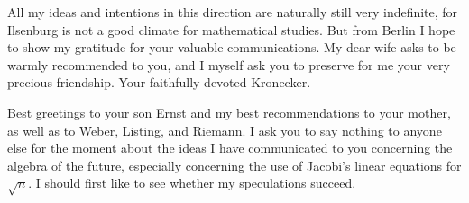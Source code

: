 \documentclass[11pt]{article}
\begin{document}
All my ideas and intentions in this direction are naturally still very indefinite, for Ilsenburg is not a good climate for mathematical studies. But from Berlin I hope to show my gratitude for your valuable communications. My dear wife asks to be warmly recommended to you, and I myself ask you to preserve for me your very precious friendship. Your faithfully devoted Kronecker.

Best greetings to your son Ernst and my best recommendations to your mother, as well as to Weber, Listing, and Riemann. I ask you to say nothing to anyone else for the moment about the ideas I have communicated to you concerning the algebra of the future, especially concerning the use of Jacobi's linear equations for $\sqrt n$. I should first like to see whether my speculations succeed.
\end{document}
